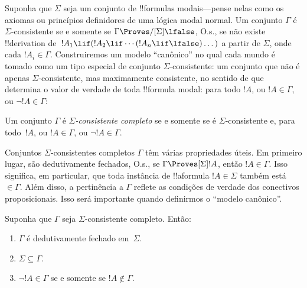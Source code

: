 \documentclass[../../../include/open-logic-section]{subfiles}
\begin{document}


Suponha que $\Sigma$ seja um conjunto de !!{formula}s modais---pense
nelas como os axiomas ou princípios definidores de uma lógica modal
normal. Um conjunto $\Gamma$ é $\Sigma$-consistente se e somente se
$\Gamma \Proves/[\Sigma] \lfalse$, O.s.\@, se não existe
!!{derivation} de~$!A_1 \lif (!A_2 \lif \cdots (!A_n \lif
\lfalse)\dots)$ a partir de $\Sigma$, onde cada $!A_i \in \Gamma$.
Construiremos um modelo ``canônico'' no qual cada mundo é tomado como
um tipo especial de conjunto $\Sigma$-consistente: um conjunto que não
é apenas $\Sigma$-consistente, mas maximamente consistente, no sentido
de que determina o valor de verdade de toda !!{formula} modal: para
todo $!A$, ou $!A \in \Gamma$, ou $\lnot !A \in \Gamma$:

\begin{defn}
  Um conjunto $\Gamma$ é \emph{$\Sigma$-consistente completo} se e
  somente se é $\Sigma$-consistente e, para todo~$!A$, ou
  $!A \in \Gamma$, ou $\lnot !A \in \Gamma$.
\end{defn}

Conjuntos $\Sigma$-consistentes completos $\Gamma$ têm várias
propriedades úteis. Em primeiro lugar, são dedutivamente fechados, O.s.\@, se $\Gamma \Proves[\Sigma] !A$, então $!A \in \Gamma$. Isso
significa, em particular, que toda instância de !!a{formula}
$!A \in \Sigma$ também está~$\in \Gamma$. Além disso, a pertinência
a $\Gamma$ reflete as condições de verdade dos conectivos
proposicionais. Isso será importante quando definirmos o ``modelo
canônico''.

\begin{prop}
  Suponha que $\Gamma$ seja $\Sigma$-consistente completo. Então:
  \begin{enumerate}
  \item {}%
    $\Gamma$ é dedutivamente fechado em~$\Sigma$.
  \item {}%
    $\Sigma \subseteq \Gamma$.
  \item {}%
    $\lnot!A \in \Gamma$ se e somente se $!A \notin
    \Gamma$.
  \end{enumerate}
\end{prop}
\end{document}
